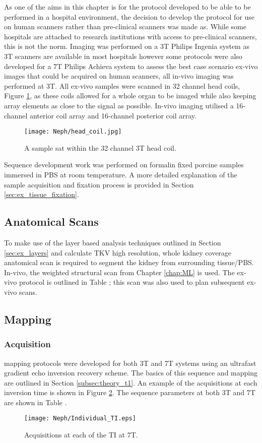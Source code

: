 As one of the aims in this chapter is for the protocol developed to be able to be performed in a hospital environment, the decision to develop the protocol for use on human scanners rather than pre-clinical scanners was made as. While some hospitals are attached to research institutions with access to pre-clinical scanners, this is not the norm. Imaging was performed on a 3T Philips Ingenia system as 3T scanners are available in most hospitals however some protocols were also developed for a 7T Philips Achieva system to assess the best case scenario ex-vivo images that could be acquired on human scanners, all in-vivo imaging was performed at 3T. All ex-vivo samples were scanned in 32 channel head coils, Figure \ref{fig:ex_head_coil}, as these coils allowed for a whole organ to be imaged while also keeping array elements as close to the signal as possible. In-vivo imaging utilised a 16-channel anterior coil array and 16-channel posterior coil array.

\begin{figure}[H]
	\centering
	\texttt{[image: Neph/head\_coil.jpg]}
	\caption{A sample sat within the 32 channel 3T head coil.}
	\label{fig:ex_head_coil}	
\end{figure}

Sequence development work was performed on formalin fixed porcine samples immersed in \ac{PBS} at room temperature. A more detailed explanation of the sample acquisition and fixation process is provided in Section \ref{sec:ex_tissue_fixation}.

\subsection{Anatomical Scans}

To make use of the layer based analysis techniques outlined in Section \ref{sec:ex_layers} and calculate \ac{TKV} high resolution, whole kidney coverage anatomical scan is required to segment the kidney from surrounding tissue/\ac{PBS}. In-vivo, the \ttwo weighted structural scan from Chapter \ref{chap:ML} is used. The ex-vivo protocol is outlined in Table ; this scan was also used to plan subsequent ex-vivo scans.

\subsection{\tone Mapping}
\subsubsection{Acquisition}
\tone mapping protocols were developed for both 3T and 7T systems using an ultrafast gradient echo inversion recovery scheme. The basics of this sequence and \tone mapping are outlined in Section \ref{subsec:theory_t1}. An example of the acquisitions at each inversion time is shown in Figure \ref{fig:ex_ir_data}. The sequence parameters at both 3T and 7T are shown in Table .
\begin{figure}[H]
	\centering
	\texttt{[image: Neph/Individual\_TI.eps]}
	\caption{Acquisitions at each of the \ac{TI} at 7T.}
	\label{fig:ex_ir_data}	
\end{figure}

